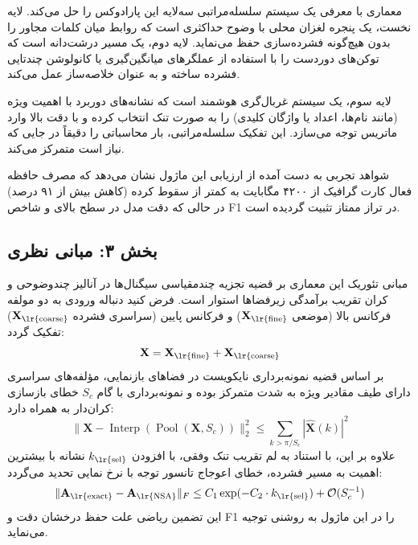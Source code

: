 معماری  با معرفی یک سیستم سلسله‌مراتبی سه‌لایه این پارادوکس را حل می‌کند. لایه نخست، یک پنجره لغزان محلی با وضوح حداکثری است که روابط میان کلمات مجاور را بدون هیچ‌گونه فشرده‌سازی حفظ می‌نماید. لایه دوم، یک مسیر درشت‌دانه است که توکن‌های دوردست را با استفاده از عملگرهای میانگین‌گیری یا کانولوشن چندتایی فشرده ساخته و به عنوان خلاصه‌ساز عمل می‌کند.

لایه سوم، یک سیستم غربال‌گری هوشمند است که نشانه‌های دوربرد با اهمیت ویژه (مانند نام‌ها، اعداد یا واژگان کلیدی) را به صورت تنک انتخاب کرده و با دقت بالا وارد ماتریس توجه می‌سازد. این تفکیک سلسله‌مراتبی، بار محاسباتی را دقیقاً در جایی که نیاز است متمرکز می‌کند.

شواهد تجربی به دست آمده از ارزیابی این ماژول نشان می‌دهد که مصرف حافظه فعال کارت گرافیک از ۴۲۰۰ مگابایت به کمتر از  سقوط کرده (کاهش بیش از ۹۱ درصد) در حالی که دقت مدل در سطح بالای  و شاخص F1 در تراز ممتاز  تثبیت گردیده است.

\subsection*{بخش ۳: مبانی نظری }
مبانی تئوریک این معماری بر قضیه تجزیه چندمقیاسی سیگنال‌ها در آنالیز چندوضوحی  و کران تقریب برآمدگی زیرفضاها استوار است. فرض کنید دنباله ورودی به دو مولفه فرکانس بالا (موضعی $\mathbf{X}_{\text{\lr{fine}}}$) و فرکانس پایین (سراسری فشرده $\mathbf{X}_{\text{\lr{coarse}}}$) تفکیک گردد:
\begin{equation}
\mathbf{X} = \mathbf{X}_{\text{\lr{fine}}} + \mathbf{X}_{\text{\lr{coarse}}}
\end{equation}
بر اساس قضیه نمونه‌برداری نایکویست در فضاهای بازنمایی، مؤلفه‌های سراسری دارای طیف مقادیر ویژه به شدت متمرکز بوده و نمونه‌برداری با گام $S_c$ خطای بازسازی کران‌دار به همراه دارد:
\begin{equation}
\|\mathbf{X} - \operatorname{Interp}(\operatorname{Pool}(\mathbf{X}, S_c))\|_2^2 \le \sum_{k > \pi/S_c} |\hat{\mathbf{X}}(k)|^2
\end{equation}
علاوه بر این، با استناد به لم تقریب تنک وفقی، با افزودن $k_{\text{\lr{sel}}}$ نشانه با بیشترین اهمیت به مسیر فشرده، خطای اعوجاج تانسور توجه با نرخ نمایی تحدید می‌گردد:
\begin{equation}
\|\mathbf{A}_{\text{\lr{exact}}} - \mathbf{A}_{\text{\lr{NSA}}}\|_F \le C_1 \exp(-C_2 \cdot k_{\text{\lr{sel}}}) + \mathcal{O}(S_c^{-1})
\end{equation}
این تضمین ریاضی علت حفظ درخشان دقت و F1 را در این ماژول به روشنی توجیه می‌نماید.

